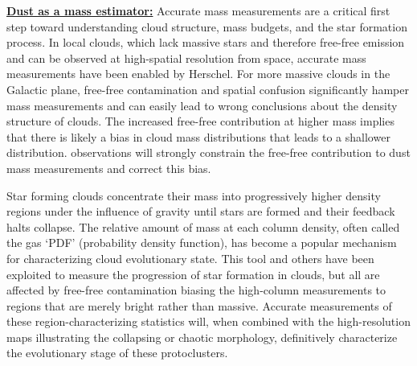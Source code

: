 \documentclass[11pt,preprint]{aastex_nofoot}
\begin{document}
\indent\underline{\textbf{\helv Dust as a mass estimator:}} 
Accurate mass measurements are a critical first step toward understanding cloud
structure, mass budgets, and the star formation process.  In local clouds,
which lack massive stars and therefore free-free emission and can be observed
at high-spatial resolution from space, accurate mass measurements have been
enabled by Herschel.  For more massive clouds in the Galactic plane, free-free
contamination and spatial confusion significantly hamper mass measurements and
can easily lead to wrong conclusions about the density structure of clouds.
The increased free-free contribution at higher mass implies that there is likely
a bias in cloud mass distributions that leads to a shallower distribution.
\MUSTANG observations will strongly constrain the free-free contribution
to dust mass measurements and correct this bias.

Star forming clouds concentrate their mass into progressively higher density
regions under the influence of gravity until stars are formed and their
feedback halts collapse.  The relative amount of mass at each column density,
often called the gas `PDF' (probability density function), has become a popular
mechanism for characterizing cloud evolutionary state.  This tool and others
\citep[e.g., column autocorrelation functions,][]{Lin2016a}  have been exploited
to measure the progression of star formation in clouds, but all are affected by
free-free contamination biasing the high-column measurements to regions that
are merely bright rather than massive.  Accurate measurements of these
region-characterizing statistics will, when combined with the high-resolution
maps illustrating the collapsing or chaotic morphology, definitively
characterize the evolutionary stage of these protoclusters.

\end{document}
